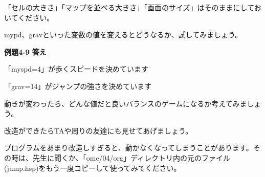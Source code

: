 \documentclass[a4paper,dvipdfmx]{jarticle}
\begin{document}
\bigskip


\bigskip


\bigskip


\bigskip


\bigskip


\bigskip


\bigskip


\bigskip


\bigskip


\bigskip


\bigskip


\bigskip


\bigskip


\bigskip


\bigskip


\bigskip


\bigskip


\bigskip


\bigskip


\bigskip


\bigskip

「セルの大きさ」「マップを並べる大きさ」「画面のサイズ」はそのままにしておいてください。

mypd、gravといった変数の値を変えるとどうなるか、試してみましょう。


\bigskip


\bigskip


\bigskip


\bigskip

{\bfseries
例題4-9 答え}


\bigskip

「myspd=4」が歩くスピードを決めています

「grav=14」がジャンプの強さを決めています


\bigskip

動きが変わったら、どんな値だと良いバランスのゲームになるか考えてみましょう。

改造ができたらTAや周りの友達にも見せてあげましょう。


\bigskip

プログラムをあまり改造しすぎると、動かなくなってしまうことがあります。その時は、先生に聞くか、「ome/04/org」ディレクトリ内の元のファイル(jump.hsp)をもう一度コピーして使ってみてください。


\bigskip


\bigskip


\bigskip


\bigskip


\bigskip


\bigskip
\end{document}
